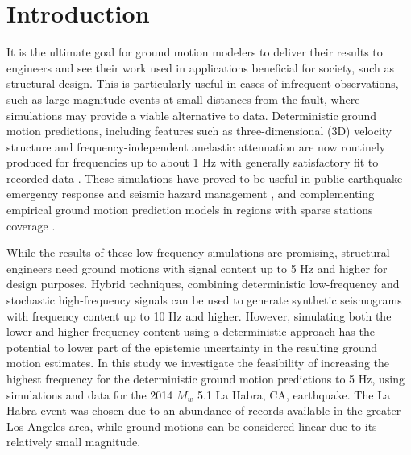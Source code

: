 \section{Introduction} \label{highf:intro}
It is the ultimate goal for ground motion modelers to deliver their results to engineers and see their work used in applications beneficial for society, such as structural design. This is particularly useful in cases of infrequent observations, such as large magnitude events at small distances from the fault, where simulations may provide a viable alternative to data. Deterministic ground motion predictions, including features such as three-dimensional (3D) velocity structure and frequency-independent anelastic attenuation are now routinely produced for frequencies up to about 1 Hz with generally satisfactory fit to recorded data . These simulations have proved to be useful in public earthquake emergency response and seismic hazard management \citep{gravesBroadbandGroundMotionSimulation2010}, and complementing empirical ground motion prediction models in regions with sparse stations coverage .

While the results of these low-frequency simulations are promising, structural engineers need ground motions with signal content up to 5 Hz and higher for design purposes. Hybrid techniques, combining deterministic low-frequency and stochastic high-frequency signals  can be used to generate synthetic seismograms with frequency content up to 10 Hz and higher. However, simulating both the lower and higher frequency content using a deterministic approach has the potential to lower part of the epistemic uncertainty in the resulting ground motion estimates. In this study we investigate the feasibility of increasing the highest frequency for the deterministic ground motion predictions to 5 Hz, using simulations and data for the 2014 $M_w$ 5.1 La Habra, CA, earthquake. The La Habra event was chosen due to an abundance of records available in the greater Los Angeles area, while ground motions can be considered linear due to its relatively small magnitude.


